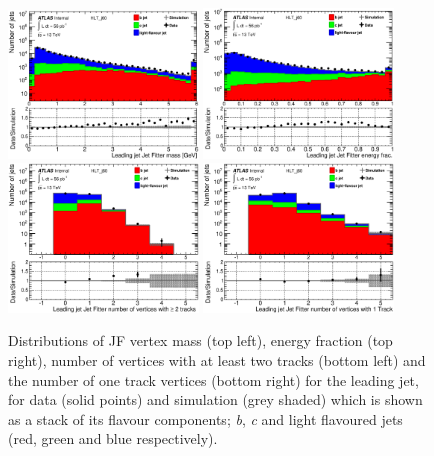 \documentclass[12pt, onecolumn,notitlepage]{article}
\begin{document}
\begin{figure}[!htb]
	 \includegraphics[width=0.45\textwidth]{plots/LeadingJet/jf_m.eps}
	 \includegraphics[width=0.45\textwidth]{plots/LeadingJet/jf_efc.eps}\\
         \includegraphics[width=0.45\textwidth]{plots/LeadingJet/jf_nvtx.eps}
         \includegraphics[width=0.45\textwidth]{plots/LeadingJet/jf_nvtx1t.eps}
	 \caption{Distributions of JF vertex mass (top left), energy fraction (top right), number of vertices with at least two tracks (bottom left)
           and the number of one track vertices (bottom right) for the leading jet, for data (solid points) and simulation (grey shaded) 
           which is shown as a stack of its flavour components; \textit{b}, \textit{c} and light flavoured jets (red, green and blue respectively).}
         \label{JF}
\end{figure}
\end{document}

